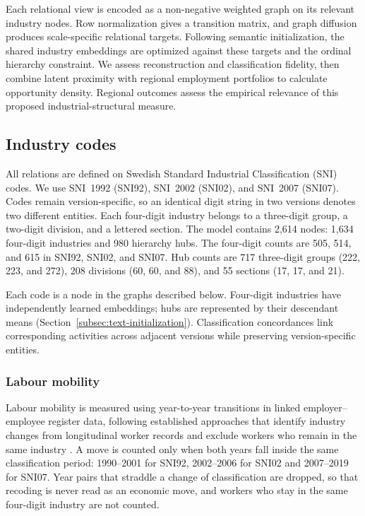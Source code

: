 \documentclass[9pt,twoside]{pnas-new}
\begin{document}
Each relational view is encoded as a non-negative weighted graph on its relevant industry nodes. Row normalization gives a transition matrix, and graph diffusion produces scale-specific relational targets. Following semantic initialization, the shared industry embeddings are optimized against these targets and the ordinal hierarchy constraint. We assess reconstruction and classification fidelity, then combine latent proximity with regional employment portfolios to calculate opportunity density. Regional outcomes assess the empirical relevance of this proposed industrial-structural measure.

\subsection{Industry codes}
\label{subsec:industry-codes}

All relations are defined on Swedish Standard Industrial Classification (SNI) codes. We use SNI~1992 (SNI92), SNI~2002 (SNI02), and SNI~2007 (SNI07). Codes remain version-specific, so an identical digit string in two versions denotes two different entities. Each four-digit industry belongs to a three-digit group, a two-digit division, and a lettered section. The model contains 2,614 nodes: 1,634 four-digit industries and 980 hierarchy hubs. The four-digit counts are 505, 514, and 615 in SNI92, SNI02, and SNI07. Hub counts are 717 three-digit groups (222, 223, and 272), 208 divisions (60, 60, and 88), and 55 sections (17, 17, and 21).

Each code is a node in the graphs described below. Four-digit industries have independently learned embeddings; hubs are represented by their descendant means (Section~\ref{subsec:text-initialization}). Classification concordances link corresponding activities across adjacent versions while preserving version-specific entities.

\subsubsection{Labour mobility}
Labour mobility is measured using year-to-year transitions in linked employer–employee register data, following established approaches that identify industry changes from longitudinal worker records and exclude workers who remain in the same industry \cite{peterfrykblomMetodOchData2021,mondaniEvolvingNetworkLabor2017}. A move is counted only when both years fall inside the same classification period: 1990--2001 for SNI92, 2002--2006 for SNI02 and 2007--2019 for SNI07. Year pairs that straddle a change of classification are dropped, so that recoding is never read as an economic move, and workers who stay in the same four-digit industry are not
counted.
\end{document}
